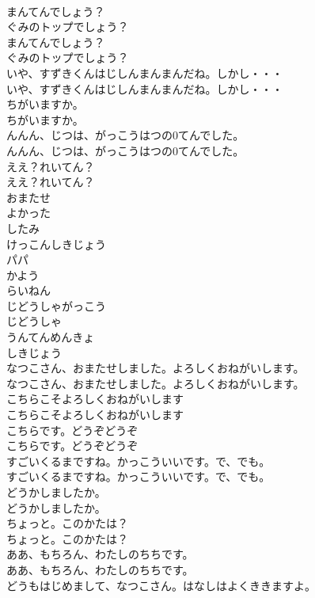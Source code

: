 \documentclass[8pt]{extreport}
\begin{document}
\begin{CJK}{UTF8}{min}
\\	まんてんでしょう？
\\	ぐみのトップでしょう？	
\\	まんてんでしょう？
\\	ぐみのトップでしょう？ 
\\	いや、すずきくんはじしんまんまんだね。しかし・・・	
\\	いや、すずきくんはじしんまんまんだね。しかし・・・ 
\\	ちがいますか。	
\\	ちがいますか。 
\\	んんん、じつは、がっこうはつの0てんでした。	
\\	んんん、じつは、がっこうはつの0てんでした。 
\\	ええ？れいてん？	
\\	ええ？れいてん？ 
\\	おまたせ
\\	よかった
\\	したみ
\\	けっこんしきじょう
\\	パパ
\\	かよう
\\	らいねん
\\	じどうしゃがっこう
\\	じどうしゃ
\\	うんてんめんきょ
\\	しきじょう
\\	なつこさん、おまたせしました。よろしくおねがいします。	
\\	なつこさん、おまたせしました。よろしくおねがいします。 
\\	こちらこそよろしくおねがいします	
\\	こちらこそよろしくおねがいします 
\\	こちらです。どうぞどうぞ	
\\	こちらです。どうぞどうぞ 
\\	すごいくるまですね。かっこういいです。で、でも。	
\\	すごいくるまですね。かっこういいです。で、でも。 
\\	どうかしましたか。	
\\	どうかしましたか。 
\\	ちょっと。このかたは？	
\\	ちょっと。このかたは？ 
\\	ああ、もちろん、わたしのちちです。	
\\	ああ、もちろん、わたしのちちです。 
\\	どうもはじめまして、なつこさん。はなしはよくききますよ。	

\end{CJK}
\end{document}

